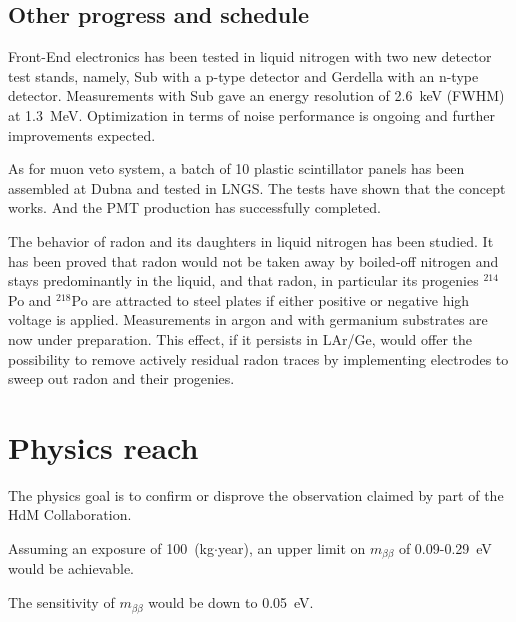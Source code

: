 \subsection{Other progress and schedule}
\label{sec:gerda:stat4}
Front-End electronics has been tested in liquid nitrogen with two new detector test stands, namely, Sub with a p-type detector and Gerdella with an n-type detector. Measurements with Sub gave an energy resolution of 2.6~keV (FWHM) at 1.3~MeV. Optimization in terms of noise performance is ongoing and further improvements expected.

As for muon veto system, a batch of 10 plastic scintillator panels has been assembled at Dubna and tested in LNGS. The tests have shown that the concept works. And the PMT production has successfully completed. 

The behavior of radon and its daughters in liquid nitrogen has been studied. It has been proved that radon would not be taken away by boiled-off nitrogen and stays predominantly in the liquid, and that radon, in particular its progenies $^{214}$Po and $^{218}$Po are attracted to steel plates if either positive or negative high voltage is applied. Measurements in argon and with germanium substrates are now under preparation. This effect, if it persists in LAr/Ge, would offer the possibility to remove actively residual radon traces by implementing electrodes to sweep out radon and their progenies. 


\section{Physics reach}
\label{sec:gerda:sens}

The physics goal is to
confirm or disprove the observation claimed by part of the HdM
Collaboration. 

Assuming an exposure of
100~(kg$\cdot$year), an upper limit on $m_{\beta\beta}$ of
0.09-0.29~eV would be achievable. 

 The sensitivity of $m_{\beta\beta}$ would be down to
0.05~eV.

